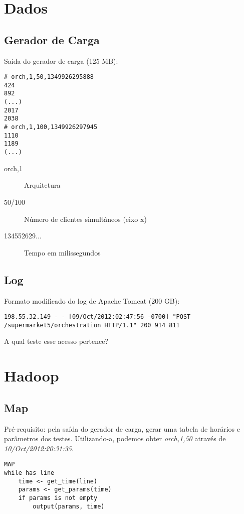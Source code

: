\documentclass{beamer}
\begin{document}
\section{Dados}

\subsection{Gerador de Carga}
\begin{frame}[fragile]
Saída do gerador de carga (125 MB):

\begin{verbatim}
# orch,1,50,1349926295888
424
892
(...)
2017
2038
# orch,1,100,1349926297945
1110
1189
(...)
\end{verbatim}

\begin{description}
\item[orch,1] Arquitetura
\item[50/100] Número de clientes simultâneos (eixo x)
\item[134552629...] Tempo em milissegundos
\end{description}
\end{frame}

\subsection{Log}
\begin{frame}[fragile]
Formato modificado do log de Apache Tomcat (200 GB):
\begin{verbatim}
198.55.32.149 - - [09/Oct/2012:02:47:56 -0700] "POST
/supermarket5/orchestration HTTP/1.1" 200 914 811
\end{verbatim}
A qual teste esse acesso pertence?
\end{frame}

\section{Hadoop}
\subsection{Map}
\begin{frame}[fragile]
Pré-requisito: pela saída do gerador de carga, gerar uma tabela de horários e parâmetros dos testes. Utilizando-a, podemos obter \emph{orch,1,50} através de \emph{10/Oct/2012:20:31:35}.

\begin{verbatim}
MAP
while has line
    time <- get_time(line)
    params <- get_params(time)
    if params is not empty
        output(params, time)
\end{verbatim}
\end{frame}
\end{document}
